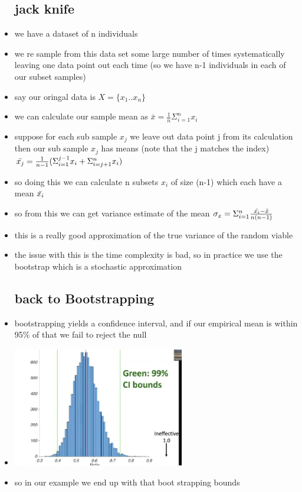 \documentclass{article}
\begin{document}
\begin{itemize}
\subsection{jack knife }
\item we have a dataset of n individuals 
\item  we re sample from this data set some large number of times systematically leaving one data point out each time (so we have n-1 individuals in each of our subset samples) 
\item say our oringal data is $X=\{x_1..x_n\}$
\item we can calculate our sample mean as $\bar{x}=\frac{1}{n}\Sigma_{i=1}^{n}x_i$
\item suppose for each sub sample $x_j$ we leave out data point j from its calculation then our sub sample $x_j$ has means (note that the j matches the index) $\Bar{x_j}=\frac{1}{n-1}(\Sigma_{i=1}^{j-1}x_i+\Sigma_{i=j+1}^{n}x_i)$
\item so doing this we can calculate n subsets $x_i$ of size (n-1) which each have a mean $\Bar{x_i}$ 
\item so from this we can get variance estimate of the mean $\sigma_{x}=\Sigma_{i=1}^{n}\frac{\Bar{x_i}-\Bar{x}}{n(n-1)}$
\item this is a really good approximation of the true variance of the random viable 
\item the issue with this is the time complexity is bad, so in practice we use the bootstrap which is a stochastic approximation 
\subsection{back to Bootstrapping}
\item bootstrapping yields a confidence interval, and if our empirical mean is within 95\% of that we fail to reject the null
\item \includegraphics[width=7.5cm]{Final_Review/lecture_7/boostrapping_bounds .jpg}
 \item so in our example we end up with that boot strapping bounds 

\end{itemize}
\end{document}
